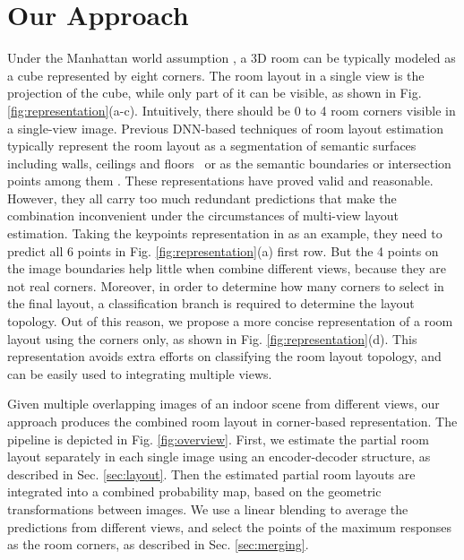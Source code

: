 \section{Our Approach}


Under the Manhattan world assumption \cite{coughlan1999manhattan}, a 3D room can be typically modeled as a cube represented by eight corners.
The room layout in a single view is the projection of the cube, while only part of it can be visible, as shown in Fig. \ref{fig:representation}(a-c). 
Intuitively, there should be 0 to 4 room corners visible in a single-view image. 
%
Previous DNN-based techniques of room layout estimation typically represent the room layout as a segmentation of semantic surfaces including walls, ceilings and floors~\cite{dasgupta2016delay} or as the semantic boundaries or intersection points among them \cite{ren2016coarse,zhao2017physics,LeeRoomNet17}. 
%
These representations have proved valid and reasonable. 
However, they all carry too much redundant predictions that make the combination inconvenient under the circumstances of multi-view layout estimation. Taking the keypoints representation in \cite{LeeRoomNet17} as an example, they need to predict all 6 points in Fig. \ref{fig:representation}(a) first row. But the 4 points on the image boundaries help little when combine different views, because they are not real corners. 
Moreover, in order to determine how many corners to select in the final layout, a classification branch is required to determine the layout topology. 
Out of this reason, we propose a more concise representation of a room layout using the corners only, as shown in Fig. \ref{fig:representation}(d). 
This representation avoids extra efforts on classifying the room layout topology, and can be easily used to integrating multiple views.
%


%

Given multiple overlapping images of an indoor scene from different views, our approach produces the combined room layout in corner-based representation. The pipeline is depicted in Fig. \ref{fig:overview}. 
%
First, we estimate the partial room layout separately in each single image using an encoder-decoder structure, as described in Sec. \ref{sec:layout}. 
Then the estimated partial room layouts are integrated into a combined probability map, based on the geometric transformations between images. 
We use a linear blending to average the predictions from different views, and select the points of the maximum responses as the room corners, as described in Sec. \ref{sec:merging}. 

